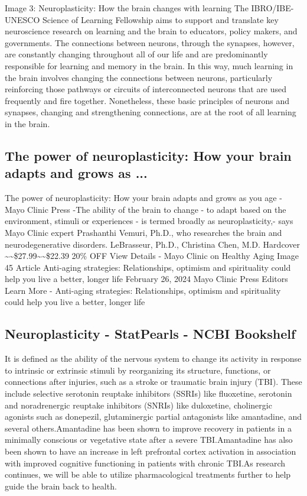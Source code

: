 \documentclass[12pt]{article}
\begin{document}
Image 3: Neuroplasticity: How the brain changes with learning The IBRO/IBE-UNESCO Science of Learning Fellowship aims to support and translate key neuroscience research on learning and the brain to educators, policy makers, and governments. The connections between neurons, through the synapses, however, are constantly changing throughout all of our life and are predominantly responsible for learning and memory in the brain. In this way, much learning in the brain involves changing the connections between neurons, particularly reinforcing those pathways or circuits of interconnected neurons that are used frequently and fire together. Nonetheless, these basic principles of neurons and synapses, changing and strengthening connections, are at the root of all learning in the brain.\subsection{The power of neuroplasticity: How your brain adapts and grows as ...}
The power of neuroplasticity: How your brain adapts and grows as you age - Mayo Clinic Press -The ability of the brain to change - to adapt based on the environment, stimuli or experiences - is termed broadly as neuroplasticity,- says Mayo Clinic expert Prashanthi Vemuri, Ph.D., who researches the brain and neurodegenerative disorders. LeBrasseur, Ph.D., Christina Chen, M.D. Hardcover \textasciitilde{}\textasciitilde{}\$27.99\textasciitilde{}\textasciitilde{}\$22.39 20\% OFF View Details - Mayo Clinic on Healthy Aging Image 45 Article Anti-aging strategies: Relationships, optimism and spirituality could help you live a better, longer life February 26, 2024 Mayo Clinic Press Editors Learn More - Anti-aging strategies: Relationships, optimism and spirituality could help you live a better, longer life\subsection{Neuroplasticity - StatPearls - NCBI Bookshelf}
It is defined as the ability of the nervous system to change its activity in response to intrinsic or extrinsic stimuli by reorganizing its structure, functions, or connections after injuries, such as a stroke or traumatic brain injury (TBI). These include selective serotonin reuptake inhibitors (SSRIs) like fluoxetine, serotonin and noradrenergic reuptake inhibitors (SNRIs) like duloxetine, cholinergic agonists such as donepezil, glutaminergic partial antagonists like amantadine, and several others.Amantadine has been shown to improve recovery in patients in a minimally conscious or vegetative state after a severe TBI.Amantadine has also been shown to have an increase in left prefrontal cortex activation in association with improved cognitive functioning in patients with chronic TBI.As research continues, we will be able to utilize pharmacological treatments further to help guide the brain back to health.
\end{document}
